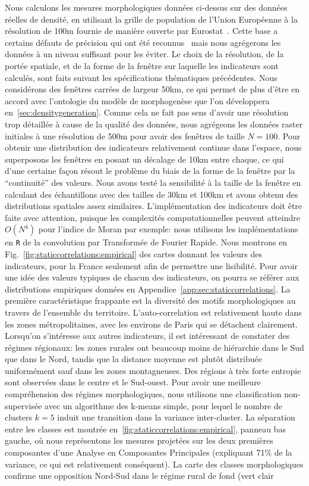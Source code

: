 {Nous calculons les mesures morphologiques données ci-dessus sur des données réelles de densité, en utilisant la grille de population de l'Union Européenne à la résolution de 100m fournie de manière ouverte par Eurostat~\cite{eurostat}. Cette base a certains défauts de précision qui ont été reconnus~\cite{bretagnolle2016ville} mais nous agrégerons les données à un niveau suffisant pour les éviter. Le choix de la résolution, de la portée spatiale, et de la forme de la fenêtre sur laquelle les indicateurs sont calculés, sont faits suivant les spécifications thématiques précédentes. Nous considérons des fenêtres carrées de largeur 50km, ce qui permet de plus d'être en accord avec l'ontologie du modèle de morphogenèse que l'on développera en~\ref{sec:densitygeneration}. Comme cela ne fait pas sens d'avoir une résolution trop détaillée à cause de la qualité des données, nous agrégeons les données raster initiales à une résolution de 500m pour avoir des fenêtres de taille $N=100$. Pour obtenir une distribution des indicateurs relativement continue dans l'espace, nous superposons les fenêtres en posant un décalage de 10km entre chaque, ce qui d'une certaine façon résout le problème du biais de la forme de la fenêtre par la ``continuité'' des valeurs. Nous avons testé la sensibilité à la taille de la fenêtre en calculant des échantillons avec des tailles de 30km et 100km et avons obtenu des distributions spatiales assez similaires. L'implémentation des indicateurs doit être faite avec attention, puisque les complexités computationnelles peuvent atteindre $O(N^4)$ pour l'indice de Moran par exemple: nous utilisons les implémentations en \texttt{R} de la convolution par Transformée de Fourier Rapide. Nous montrons en Fig.~\ref{fig:staticcorrelations:empirical} des cartes donnant les valeurs des indicateurs, pour la France seulement afin de permettre une lisibilité. Pour avoir une idée des valeurs typiques de chacun des indicateurs, on pourra se référer aux distributions empiriques données en Appendice~\ref{app:sec:staticcorrelations}. La première caractéristique frappante est la diversité des motifs morphologiques au travers de l'ensemble du territoire. L'auto-correlation est relativement haute dans les zones métropolitaines, avec les environs de Paris qui se détachent clairement. Lorsqu'on s'intéresse aux autres indicateurs, il est intéressant de constater des régimes régionaux: les zones rurales ont beaucoup moins de hiérarchie dans le Sud que dans le Nord, tandis que la distance moyenne est plutôt distribuée uniformément sauf dans les zones montagneuses. Des régions à très forte entropie sont observées dans le centre et le Sud-ouest. Pour avoir une meilleure compréhension des régimes morphologiques, nous utilisons une classification non-supervisée avec un algorithme des k-means simple, pour lequel le nombre de clusters $k=5$ induit une transition dans la variance inter-cluster. La séparation entre les classes est montrée en~\ref{fig:staticcorrelations:empirical}, panneau bas gauche, où nous représentons les mesures projetées sur les deux premières composantes d'une Analyse en Composantes Principales (expliquant 71\% de la variance, ce qui est relativement conséquent). La carte des classes morphologiques confirme une opposition Nord-Sud dans le régime rural de fond (vert clair }
